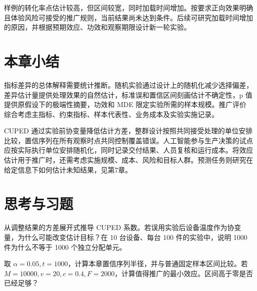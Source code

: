 样例的转化率点估计较高，但区间较宽，同时加载时间增加。按要求正向效果明确且体验风险可接受的推广规则，当前结果尚未达到条件。后续可研究加载时间增加的原因，并根据预期效应、功效和观察期限设计新一轮实验。

\section*{本章小结}

指标差异的总体解释需要统计推断。随机实验通过设计上的随机化减少选择偏差，差异估计量提供处理效果的自然估计，标准误和置信区间刻画估计不确定性，p 值提供原假设下的极端性摘要，功效和 MDE 限定实验所需的样本规模。推广评价综合考虑主指标、约束指标、样本代表性、业务成本及实验实施记录。

CUPED 通过实验前协变量降低估计方差，整群设计按照共同接受处理的单位安排比较，置信序列在所有观察时点共同控制覆盖错误。人工智能参与生产决策的试点应按实际执行单位安排随机化，同时记录交付结果、人员复核和运行成本。将效应估计用于推广时，还需考虑实施规模、成本、风险和目标人群。预测任务则研究在给定信息下如何估计未知结果，见第7章。


\section*{思考与习题}

\begin{exercise}[方差与设计]
从调整结果的方差展开式推导 CUPED 系数。若误用实验后设备温度作为协变量，为什么可能改变估计目标？在 10 台设备、每台 100 件的实验中，说明 1000 件为什么不等于 1000 个独立分配单元。
\end{exercise}
\begin{exercise}[序贯与业务阈值]
取 \(\alpha=0.05,t=1000\)，计算本章置信序列半径，并与普通固定样本区间比较。若 \(M=10000,v=20,c=0.4,F=2000\)，计算值得推广的最小效应。区间高于零是否已经足够？
\end{exercise}

